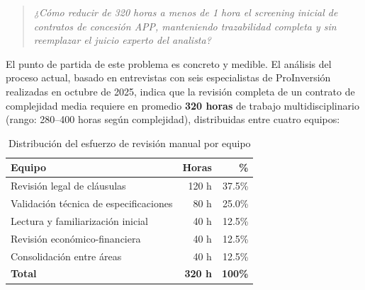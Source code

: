 \begin{quote}
\textit{¿Cómo reducir de 320 horas a menos de 1 hora el \textit{screening} inicial de contratos de concesión APP, manteniendo trazabilidad completa y sin reemplazar el juicio experto del analista?}
\end{quote}

El punto de partida de este problema es concreto y medible. El análisis del proceso
actual, basado en entrevistas con seis especialistas de ProInversión realizadas en
octubre de 2025, indica que la revisión completa de un contrato de complejidad media
requiere en promedio \textbf{320 horas} de trabajo multidisciplinario (rango:
280--400 horas según complejidad), distribuidas entre cuatro equipos:

\begin{table}[H]
\centering
\caption{Distribución del esfuerzo de revisión manual por equipo}
\label{tab:esfuerzo_revision}
\begin{tabular}{lrr}
\toprule
\textbf{Equipo} & \textbf{Horas} & \textbf{\%} \\
\midrule
Revisión legal de cláusulas         & 120 h & 37.5\% \\
Validación técnica de especificaciones & 80 h & 25.0\% \\
Lectura y familiarización inicial   & 40 h & 12.5\% \\
Revisión económico-financiera       & 40 h & 12.5\% \\
Consolidación entre áreas           & 40 h & 12.5\% \\
\midrule
\textbf{Total}                      & \textbf{320 h} & \textbf{100\%} \\
\bottomrule
\end{tabular}
\end{table}

